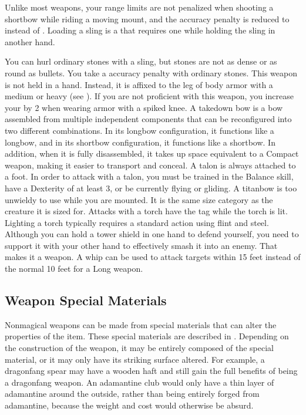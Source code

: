     Unlike most  weapons, your range limits are not penalized when shooting a shortbow while riding a moving mount, and the accuracy penalty is reduced to  instead of .
     Loading a sling is a  that requires one  while holding the sling in another hand.
    \par You can hurl ordinary stones with a sling, but stones are not as dense or as round as bullets. You take a  accuracy penalty with ordinary stones.
     This weapon is not held in a hand.
    Instead, it is affixed to the leg of body armor with a medium or heavy  (see ).
    If you are not proficient with this weapon, you increase your  by 2 when wearing armor with a spiked knee.
     A takedown bow is a bow assembled from multiple independent components that can be reconfigured into two different combinations.
    In its longbow configuration, it functions like a longbow, and in its shortbow configuration, it functions like a shortbow.
    In addition, when it is fully disassembled, it takes up space equivalent to a Compact weapon, making it easier to transport and conceal.
     A talon is always attached to a foot.
    In order to attack with a talon, you must be trained in the Balance skill, have a Dexterity of at least 3, or be currently flying or gliding.
     A titanbow is too unwieldy to use while you are mounted.
    It is the same size category as the creature it is sized for.
     Attacks with a torch have the \atFire tag while the torch is lit.
    Lighting a torch typically requires a standard action using flint and steel.
     Although you can hold a tower shield in one hand to defend yourself, you need to support it with your other hand to effectively smash it into an enemy.
    That makes it a  weapon.
     A whip can be used to attack targets within 15 feet instead of the normal 10 feet for a Long weapon.

  \subsection{Weapon Special Materials}\label{Weapon Special Materials}
    Nonmagical weapons can be made from special materials that can alter the properties of the item.
    These special materials are described in .
    Depending on the construction of the weapon, it may be entirely composed of the special material, or it may only have its striking surface altered.
    For example, a dragonfang spear may have a wooden haft and still gain the full benefits of being a dragonfang weapon.
    An adamantine club would only have a thin layer of adamantine around the outside, rather than being entirely forged from adamantine, because the weight and cost would otherwise be absurd.

